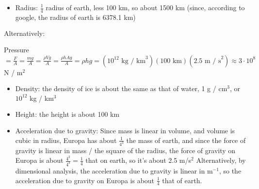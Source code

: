\documentclass{esg8012pset}
\begin{document}
\begin{solution}
\begin{itemize}
      \begin{itemize}
        \item Radius: $\frac{1}{4}$ radius of earth, less 100 km, so about 1500 km (since, according to google, the radius of earth is 6378.1 km)
      \end{itemize}
  \end{itemize} 
  \vspace{2em}
  \noindent Alternatively: \par
  Pressure $ = \frac{F}{A} = \frac{mg}{A} = \frac{\rho Vg}{A} = \frac{\rho h A g}{A} = \rho h g = (10^{12}\text{ kg / km}^3)(100\text{ km})(2.5\text{ m / s}^2) \approx 3\cdot 10^8$ N / m$^2$
  \begin{itemize}
    \item Density: the density of ice is about the same as that of water, 1 g / cm$^3$, or $10^{12}$ kg / km$^3$
    \item Height: the height is about 100 km
    \item Acceleration due to gravity: Since mass is linear in volume, and volume is cubic in radius, Europa has about $\frac{1}{4^3}$ the mass of earth, and since the force of gravity is linear in mass / the square of the radius, the force of gravity on Europa is about $\frac{4^2}{4^3} = \frac{1}{4}$ that on earth, so it's about 2.5 m/s$^2$  Alternatively, by dimensional analysis, the acceleration due to gravity is linear in m$^{-1}$, so the acceleration due to gravity on Europa is about $\frac{1}{4}$ that of earth.
  \end{itemize}
\end{solution}%
\end{document}
